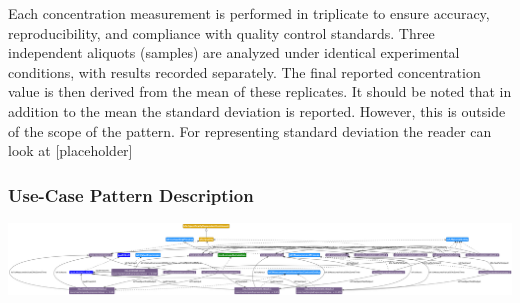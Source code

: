 Each concentration measurement is performed in triplicate to ensure accuracy, reproducibility, and compliance with quality control standards. Three independent aliquots (samples) are analyzed under identical experimental conditions, with results recorded separately. The final reported concentration value is then derived from the mean of these replicates. It should be noted that in addition to the mean the standard deviation is reported. However, this is outside of the scope of the pattern. For representing standard deviation the reader can look at [placeholder]

\subsubsection*{Use-Case Pattern Description}

\includegraphics[scale=0.15]{scenarios/measurements/image/measurement_aggregate_usecase1.png}
